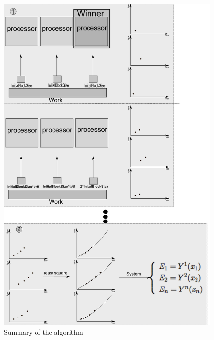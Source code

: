 \documentclass[journal]{IEEEtran}
\begin{document}
\begin{figure}[!t]
	\centering
	\includegraphics[scale=0.28]{NovaFigura_Algoritmo.pdf} 
	\caption{Summary of the algorithm}
	\label{fig: algoritmo}
\end{figure}

\end{document}
